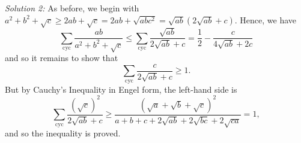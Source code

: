 \documentclass[a4paper, 12pt]{article}
\begin{document}
\begin{enumerate}
	  \emph{Solution 2:} As before, we begin with $a^2 + b^2 + \sqrt{c} \geq 2ab + \sqrt{c} = 2ab + \sqrt{abc^2} = \sqrt{ab}\left(2\sqrt{ab}+c\right)$. Hence, we have
	    \[ \sum_\textrm{cyc} \frac {ab}{a^2 + b^2 + \sqrt {c}} \leq \sum_\textrm{cyc} \frac{\sqrt{ab}}{2\sqrt{ab}+c} = \frac{1}{2} - \frac{c}{4\sqrt{ab}+2c} \]
	  and so it remains to show that
	    \[ \sum_\textrm{cyc} \frac{c}{2\sqrt{ab}+c} \geq 1. \]
	  But by Cauchy's Inequality in Engel form, the left-hand side is
	    \[ \sum_\textrm{cyc} \frac{(\sqrt{c})^2}{2\sqrt{ab}+c} \geq \frac{\left(\sqrt{a}+\sqrt{b}+\sqrt{c}\right)^2}{a+b+c+2\sqrt{ab}+2\sqrt{bc}+2\sqrt{ca}} = 1, \]
	  and so the inequality is proved.
\end{enumerate}
\end{document}
